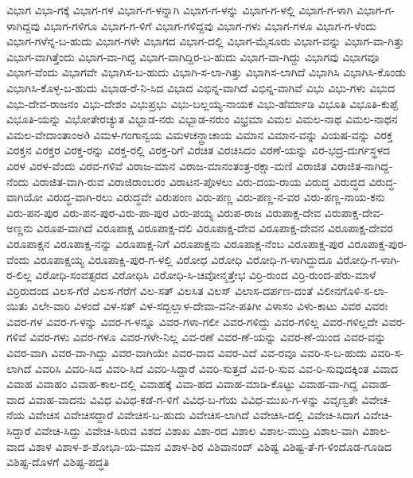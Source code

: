 ವಿಭಾಗ
ವಿಭಾ-ಗಕ್ಕೆ
ವಿಭಾಗ-ಗಳ
ವಿಭಾಗ-ಗ-ಳನ್ನಾಗಿ
ವಿಭಾಗ-ಗ-ಳನ್ನು
ವಿಭಾಗ-ಗ-ಳಲ್ಲಿ
ವಿಭಾಗ-ಗ-ಳಾಗಿ
ವಿಭಾಗ-ಗ-ಳಾಗಿದ್ದವು
ವಿಭಾಗ-ಗಳಿಗೂ
ವಿಭಾಗ-ಗ-ಳಿಗೆ
ವಿಭಾಗ-ಗಳಿದ್ದವು
ವಿಭಾಗ-ಗಳು
ವಿಭಾಗ-ಗಳೂ
ವಿಭಾಗ-ಗ-ಳೆಂದು
ವಿಭಾಗ-ಗಳೆನ್ನ-ಬ-ಹುದು
ವಿಭಾಗ-ಗಳೇ
ವಿಭಾಗದ
ವಿಭಾಗ-ದಲ್ಲಿ
ವಿಭಾಗ-ಮೈಸೂರು
ವಿಭಾಗ-ವನ್ನು
ವಿಭಾಗ-ವಾ-ಗಿತ್ತು
ವಿಭಾಗ-ವಾಗಿತ್ತೆಂದು
ವಿಭಾಗ-ವಾ-ಗಿದ್ದ
ವಿಭಾಗ-ವಾಗಿದ್ದಿರ-ಬ-ಹುದು
ವಿಭಾಗ-ವಾ-ಗಿದ್ದು
ವಿಭಾಗವು
ವಿಭಾಗವೂ
ವಿಭಾಗ-ವೆಂದು
ವಿಭಾಗವೇ
ವಿಭಾಗಿಸ-ಬ-ಹುದು
ವಿಭಾಗಿ-ಸ-ಲಾ-ಗಿತ್ತು
ವಿಭಾಗಿಸ-ಲಾಗಿದೆ
ವಿಭಾಗಿಸಿ
ವಿಭಾಗಿಸಿ-ಕೊಂಡು
ವಿಭಾಗಿಸಿ-ಕೊಳ್ಳ-ಬ-ಹುದು
ವಿಭಾಡ-ರೆ-ನಿ-ಸಿದ
ವಿಭಾದ
ವಿಭಿನ್ನ-ವಾಗಿದೆ
ವಿಭಿನ್ನ-ವಾಗಿವೆ
ವಿಭು
ವಿಭು-ಗಳು
ವಿಭುದ
ವಿಭು-ದೇವ-ರಾಜನಂ
ವಿಭು-ದೇಶಂ
ವಿಭುಪ್ರಭು
ವಿಭು-ಬಲ್ಲಯ್ಯ-ನಾಯಕ
ವಿಭು-ಹೆರ್ಮಾಡಿ
ವಿಭೂತಿ
ವಿಭೂತಿ-ಕುಪ್ಪೆ
ವಿಭೂತಿ-ಯನ್ನು
ವಿಭೋತೇರಚ್ಯುತ
ವಿಭ್ಬಾಡ-ನರು
ವಿಭ್ಬಾಡ-ನರುಂ
ವಿಭ್ರಮಾ
ವಿಮಲ
ವಿಮಲ-ನಾಥ
ವಿಮಲ-ನಾಥನ
ವಿಮಲ-ವೇದಾಂತಾಂಅð
ವಿಮಳ-ಗಂಗಾನ್ವಯ
ವಿಮಳಚನ್ದ್ರಾಚಾಯ
ವಿಮಾನ
ವಿಮಾನ-ವನ್ನು
ವಿಯಷ-ವನ್ನು
ವಿರಕ್ತ
ವಿರಕ್ತನ
ವಿರಕ್ತರ
ವಿರಕ್ತ-ರನ್ನು
ವಿರಕ್ತ-ರಲ್ಲಿ
ವಿರಕ್ತ-ರಿಗೆ
ವಿರಚಿತ
ವಿರಚಿಸಿದಂ
ವಿರಣೆ-ಯನ್ನು
ವಿರ-ಭದ್ರ-ದುರ್ಗಸ್ಥಳದ
ವಿರಳ
ವಿರಳ-ವೆಂದು
ವಿರವ-ಗಳಿವೆ
ವಿರಾಜ-ಮಾನ
ವಿರಾಜ-ಮಾನಂತಂತ್ರ-ರಕ್ಷಾ-ಮಣಿ
ವಿರಾಜಿತ
ವಿರಾಜಿತ-ನಾಗಿದ್ದ-ನೆಂದು
ವಿರಾಜಿತ-ವಾಗಿ-ರುವ
ವಿರಾಜಿರಾಂಬರಂ
ವಿರಾಟನ-ಪೊಳಲು
ವಿರು-ದಯ-ರಾಯ
ವಿರುದ್ಧ
ವಿರುದ್ಧದ
ವಿರುದ್ಧ-ವಾಗಿಯೋ
ವಿರುದ್ಧ-ವಾಗಿ-ರಲು
ವಿರುದ್ಧವೇ
ವಿರುಪಂಣ
ವಿರು-ಪಣ್ಣ
ವಿರು-ಪಣ್ಣ-ನ-ವರ
ವಿರು-ಪಣ್ಣ-ನಾಯ-ಕನು
ವಿರು-ಪನ-ಪುರ
ವಿರು-ಪನ-ಪುರ-ವಿರು-ಪಾ-ಪುರ
ವಿರು-ಪಯ್ಯ
ವಿರುಪ-ರಾಜ
ವಿರುಪಾಕ್ಷ-ದೇವ
ವಿರುಪಾಕ್ಷ-ದೇವ-ಅಣ್ಣನು
ವಿರೂಪ-ವಾಗಿದೆ
ವಿರೂಪಾಕ್ಷ
ವಿರೂಪಾಕ್ಷ-ದಲಿ
ವಿರೂಪಾಕ್ಷ-ದೇವ
ವಿರೂಪಾಕ್ಷ-ದೇವನ
ವಿರೂಪಾಕ್ಷ-ದೇವರ
ವಿರೂಪಾಕ್ಷನ
ವಿರೂಪಾಕ್ಷ-ನನ್ನು
ವಿರೂಪಾಕ್ಷ-ನಿಗೆ
ವಿರೂಪಾಕ್ಷನು
ವಿರೂಪಾಕ್ಷ-ನೆಂಬ
ವಿರೂಪಾಕ್ಷ-ಪುರ
ವಿರೂಪಾಕ್ಷ-ಪುರ-ವೆಂದು
ವಿರೂಪಾಕ್ಷಯ್ಯ
ವಿರೂಪಾಕ್ಷಿ-ಪುರ-ಗ-ಳಲ್ಲಿ
ವಿರೋಧ
ವಿರೋಧಿ
ವಿರೋಧಿ-ಗ-ಳಾಗಿದ್ದುದೂ
ವಿರೋಧಿ-ಗ-ಳಾಗಿ-ರ-ಲಿಲ್ಲ
ವಿರೋಧಿ-ಸಂವತ್ಸರದ
ವಿರೋಧಿಸಿ
ವಿರೋಧಿ-ಸಿ-ಚಿವೋನ್ಮತ್ತೇಭ
ವಿರ್ರಿ-ರುಂದ
ವಿರ್ರಿ-ರುಂದ-ಪೆರು-ಮಾಳೆ
ವಿರ್ರಿರುದಂದ
ವಿಲಸ-ಗೆರೆ
ವಿಲಸ-ಗೆರೆಗೆ
ವಿಲ-ಸತ್
ವಿಲಸಿತ
ವಿಲಸ್
ವಿಲಾಸ-ದರ್ಪಣ-ದಂತೆ
ವಿಲೀನಗೊಳಿ-ಸ-ಲಾ-ಯಿತು
ವಿಲೇ-ವಾರಿ
ವಿಳಂದೆ
ವಿಳ-ಸತ್
ವಿಳ-ಸದ್ಬಲ್ಲಾಳ-ದೇವಾ-ವನೀ-ಪತಿಗೀ
ವಿಳಾಸಂ
ವಿಳು-ಕಾಟು
ವಿವರ
ವಿವರಃ
ವಿವರ-ಗಳ
ವಿವರ-ಗ-ಳನ್ನು
ವಿವರ-ಗ-ಳನ್ನೂ
ವಿವರ-ಗಳಾ-ಗಲೀ
ವಿವರ-ಗಳಿದ್ದು
ವಿವರ-ಗಳಿಲ್ಲ
ವಿವರ-ಗಳಿಲ್ಲದೇ
ವಿವರ-ಗಳಿವೆ
ವಿವರ-ಗಳು
ವಿವರ-ಗಳೂ
ವಿವರ-ಗಳೇ-ನಿಲ್ಲ
ವಿವ-ರಣೆ
ವಿವರ-ಣೆ-ಯನ್ನು
ವಿವರ-ಣೆ-ಯಿಂದ
ವಿವರ-ವನ್ನು
ವಿವರ-ವಾಗಿ
ವಿವರ-ವಾ-ಗಿದ್ದು
ವಿವರ-ವಾಗಿಯೇ
ವಿವರ-ವಾದ
ವಿವರ-ವಿದೆ
ವಿವ-ರವೂ
ವಿವರಿ-ಸ-ಬ-ಹುದು
ವಿವರಿ-ಸ-ಲಾಗಿದೆ
ವಿವರಿಸಿ
ವಿವರಿ-ಸಿದ
ವಿವರಿ-ಸಿದೆ
ವಿವರಿ-ಸಿದ್ದಾರೆ
ವಿವರಿ-ಸುತ್ತದೆ
ವಿವ-ರಿ-ಸುವ
ವಿವ-ರಿ-ಸುವುದಕ್ಕಿಂತ
ವಿವಾದ
ವಿವಾಹ
ವಿವಾಹಂ
ವಿವಾಹ-ಕಾಲ-ದಲ್ಲಿ
ವಿವಾಹಕ್ಕೆ
ವಿವಾ-ಹದ
ವಿವಾಹ-ಮಾಡಿ-ಕೊಟ್ಟು
ವಿವಾಹ-ವಾ-ಗಿದ್ದ
ವಿವಾಹ-ವಾದ
ವಿವಾಹ-ವಾದನು
ವಿವಿಧ
ವಿವಿಧ-ಕಡೆ-ಗ-ಳಿಗೆ
ವಿವಿಧ-ಬ-ಗೆಯ
ವಿವಿಧ-ಮುಖ-ಗ-ಳನ್ನು
ವಿವೃಣ್ವತೇ
ವಿವೇಚ-ನೆಯ
ವಿವೇಚಿಸ
ವಿವೇಚಿಸದ್ದಾರೆ
ವಿವೇಚಿಸ-ಬ-ಹುದು
ವಿವೇಚಿಸ-ಲಾಗಿದೆ
ವಿವೇಚಿಸಿ-ದಲ್ಲಿ
ವಿವೇಚಿ-ಸಿದಾಗ
ವಿವೇಚಿ-ಸಿದ್ದಾರೆ
ವಿವೇಚಿ-ಸಿದ್ದು
ವಿವೇಚಿ-ಸಿರುವ
ವಿಶದ
ವಿಶಾಖ
ವಿಶಾ-ರದ
ವಿಶಾಲ
ವಿಶಾಲ-ಮುದ್ರಿ
ವಿಶಾಲ-ವಾಗಿ
ವಿಶಾಲ-ವಾದ
ವಿಶಾಳ
ವಿಶಾಳ-ಶ-ಶೋಭಾ-ಯ-ಮಾನ
ವಿಶಾಳ-ಶಿರ
ವಿಶಿವಾನಂದ್
ವಿಶಿಷ್ಟ
ವಿಶಿಷ್ಟ-ತೆ-ಗ-ಳಿಂದೊಡ-ಗೂಡಿದ
ವಿಶಿಷ್ಟ-ದೊಳಗೆ
ವಿಶಿಷ್ಟ-ಪದ್ಧತಿ
